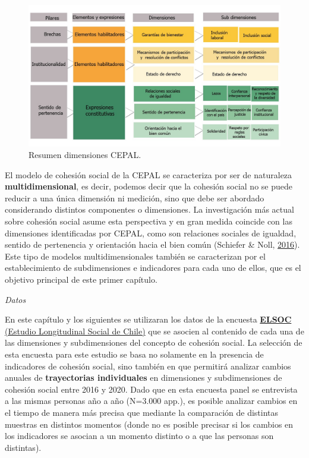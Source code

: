 \documentclass[
  12pt,
]{book}
\begin{document}
\begin{figure}[H]

{\centering \includegraphics[width=1\linewidth,height=1\textheight]{images/dimensiones-cepal} 

}

\caption{Resumen dimensiones CEPAL.}\label{fig:esquema-cepal}
\end{figure}

El modelo de cohesión social de la CEPAL se caracteriza por ser de naturaleza \textbf{multidimensional}, es decir, podemos decir que la cohesión social no se puede reducir a una única dimensión ni medición, sino que debe ser abordado considerando distintos componentes o dimensiones. La investigación más actual sobre cohesión social asume esta perspectiva y en gran medida coincide con las dimensiones identificadas por CEPAL, como son relaciones sociales de igualdad, sentido de pertenencia y orientación hacia el bien común (Schiefer \& Noll, \protect\hyperlink{ref-schiefer_essentials_2016}{2016}). Este tipo de modelos multidimensionales también se caracterizan por el establecimiento de subdimensiones e indicadores para cada uno de ellos, que es el objetivo principal de este primer capítulo.

\emph{Datos}

En este capítulo y los siguientes se utilizaran los datos de la encuesta \href{https://coes.cl/encuesta-panel/}{\textbf{ELSOC} (Estudio Longitudinal Social de Chile)} que se asocien al contenido de cada una de las dimensiones y subdimensiones del concepto de cohesión social. La selección de esta encuesta para este estudio se basa no solamente en la presencia de indicadores de cohesión social, sino también en que permitirá analizar cambios anuales de \textbf{trayectorias individuales} en dimensiones y subdimensiones de cohesión social entre 2016 y 2020. Dado que en esta encuesta panel se entrevista a las mismas personas año a año (N=3.000 app.), es posible analizar cambios en el tiempo de manera más precisa que mediante la comparación de distintas muestras en distintos momentos (donde no es posible precisar si los cambios en los indicadores se asocian a un momento distinto o a que las personas son distintas).
\end{document}
